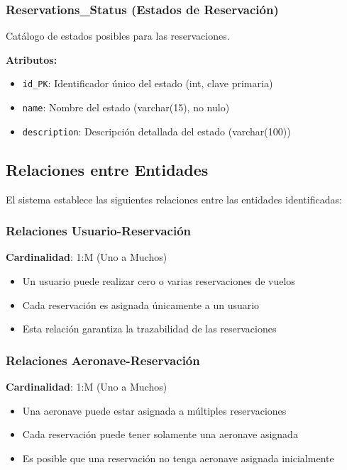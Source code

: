\documentclass[12pt,a4paper]{article}
\begin{document}
\subsubsection{Reservations\_Status (Estados de Reservación)}
Catálogo de estados posibles para las reservaciones.

\textbf{Atributos:}
\begin{itemize}
    \item \texttt{id\_PK}: Identificador único del estado (int, clave primaria)
    \item \texttt{name}: Nombre del estado (varchar(15), no nulo)
    \item \texttt{description}: Descripción detallada del estado (varchar(100))
\end{itemize}

\subsection{Relaciones entre Entidades}

El sistema establece las siguientes relaciones entre las entidades identificadas:

\subsubsection{Relaciones Usuario-Reservación}
\textbf{Cardinalidad}: 1:M (Uno a Muchos)
\begin{itemize}
    \item Un usuario puede realizar cero o varias reservaciones de vuelos
    \item Cada reservación es asignada únicamente a un usuario
    \item Esta relación garantiza la trazabilidad de las reservaciones
\end{itemize}

\subsubsection{Relaciones Aeronave-Reservación}
\textbf{Cardinalidad}: 1:M (Uno a Muchos)
\begin{itemize}
    \item Una aeronave puede estar asignada a múltiples reservaciones
    \item Cada reservación puede tener solamente una aeronave asignada
    \item Es posible que una reservación no tenga aeronave asignada inicialmente
\end{itemize}
\end{document}
